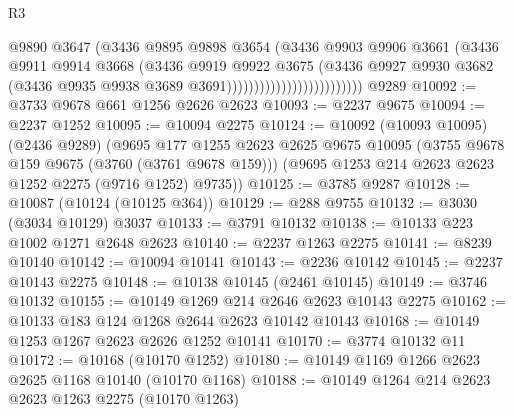 \begin{lexlean}{R3}
\begin{coremodule}
                                          @9890
                                          @3647
                                          (@3436
                                            @9895
                                            @9898
                                            @3654
                                            (@3436
                                              @9903
                                              @9906
                                              @3661
                                              (@3436
                                                @9911
                                                @9914
                                                @3668
                                                (@3436
                                                  @9919
                                                  @9922
                                                  @3675
                                                  (@3436
                                                    @9927
                                                    @9930
                                                    @3682
                                                    (@3436
                                                      @9935
                                                      @9938
                                                      @3689
                                                      @3691)))))))))))))))))))))))))
    @9289
@10092 := @3733 @9678 @661 @1256 @2626 @2623
@10093 := @2237 @9675
@10094 := @2237 @1252
@10095 := @10094 @2275
@10124 := @10092
    (@10093 @10095)
    (@2436 @9289)
    (@9695
      @177
      @1255
      @2623
      @2625
      @9675
      @10095
      (@3755 @9678 @159 @9675 (@3760 (@3761 @9678 @159)))
      (@9695 @1253 @214 @2623 @2623 @1252 @2275 (@9716 @1252) @9735))
@10125 := @3785 @9287
@10128 := @10087 (@10124 (@10125 @364))
@10129 := @288 @9755
@10132 := @3030 (@3034 @10129) @3037
@10133 := @3791 @10132
@10138 := @10133 @223 @1002 @1271 @2648 @2623
@10140 := @2237 @1263 @2275
@10141 := @8239 @10140
@10142 := @10094 @10141
@10143 := @2236 @10142
@10145 := @2237 @10143 @2275
@10148 := @10138 @10145 (@2461 @10145)
@10149 := @3746 @10132
@10155 := @10149 @1269 @214 @2646 @2623 @10143 @2275
@10162 := @10133 @183 @124 @1268 @2644 @2623 @10142 @10143
@10168 := @10149 @1253 @1267 @2623 @2626 @1252 @10141
@10170 := @3774 @10132 @11
@10172 := @10168 (@10170 @1252)
@10180 := @10149 @1169 @1266 @2623 @2625 @1168 @10140 (@10170 @1168)
@10188 := @10149 @1264 @214 @2623 @2623 @1263 @2275 (@10170 @1263)

\end{coremodule}
\end{lexlean}
